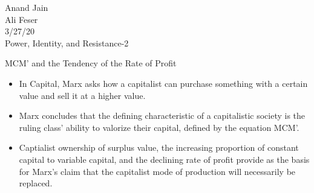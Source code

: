 \documentclass[12pt]{article}
\begin{document}
\noindent Anand Jain \\ 
Ali Feser \\
3/27/20 \\
Power, Identity, and Resistance-2 
\begin{center}
    MCM' and the Tendency of the Rate of Profit
\end{center}
\begin{itemize} 
    \item In Capital, Marx asks how a capitalist can purchase something with a certain value and sell it at a higher value. 
    \item Marx concludes that the defining characteristic of a capitalistic society is the ruling class' ability to valorize their capital, defined by the equation MCM'. 
    \item Captialist ownership of surplus value, the increasing proportion of constant capital to variable capital, and the declining rate of profit provide as the basis for Marx's claim that the capitalist mode of production will necessarily be replaced.


\end{itemize}
\end{document}

